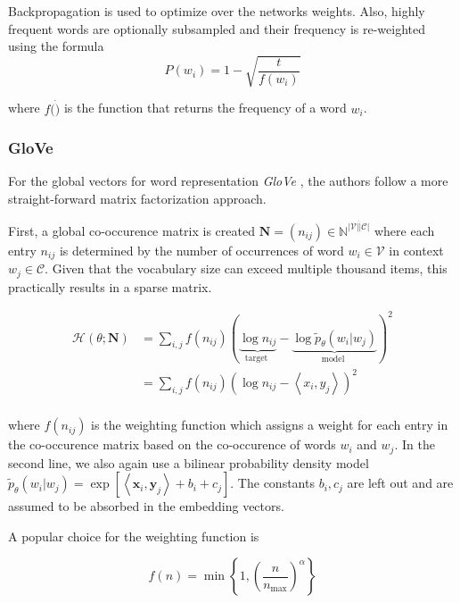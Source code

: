 \documentclass[a4paper,12pt,twoside,openright]{report}
\begin{document}

Backpropagation is used to optimize over the networks weights. 
Also, highly frequent words are optionally subsampled and their frequency is re-weighted using the formula $$
P\left(w_{i}\right)=1-\sqrt{\frac{t}{f\left(w_{i}\right)}}
$$

where $f( \dot )$ is the function that returns the frequency of a word $w_i$.

\subsubsection{GloVe}

For the global vectors for word representation \textit{GloVe} \cite{pennington14}, the authors follow a more straight-forward matrix factorization approach.

First, a global co-occurence matrix is created $\mathbf{N} = (n_{ij}) \in \mathbb{N}^{|\mathcal{V}| \dot |\mathcal{C}|}$ where each entry $n_{ij}$ is determined by the number of occurrences of word $w_i \in \mathcal{V}$ in context $w_j \in \mathcal{C}$.
Given that the vocabulary size can exceed multiple thousand items, this practically results in a sparse matrix.


\begin{align}
\mathcal{H}(\theta ; \mathbf{N}) &=
\sum_{i, j} f\left(n_{i j}\right)(\underbrace{\log n_{i j}}_{\text {target }}-\underbrace{\log \tilde{p}_{\theta}\left(w_{i} | w_{j}\right)}_{\text {model }})^{2} \\
&= \sum_{i, j} f\left(n_{i j}\right)(\log n_{i j} - \left\langle x_i, y_j \right\rangle )^{2} \\
\end{align}

where $f(n_{ij})$ is the weighting function which assigns a weight for each entry in the co-occurence matrix based on the co-occurence of words $w_i$ and $w_j$. 
In the second line, we also again use a bilinear probability density model $\tilde{p}_{\theta}\left(w_{i} | w_{j}\right)=\exp \left[\left\langle\mathbf{x}_{i}, \mathbf{y}_{j}\right\rangle+b_{i}+c_{j}\right]$.
The constants $b_i, c_j$ are left out and are assumed to be absorbed in the embedding vectors.

A popular choice for the weighting function is 

$$
f(n) = \min \left\lbrace 1, \left(\frac{n}{n_{\max}}\right)^{\alpha} \right\rbrace
$$
\end{document}
